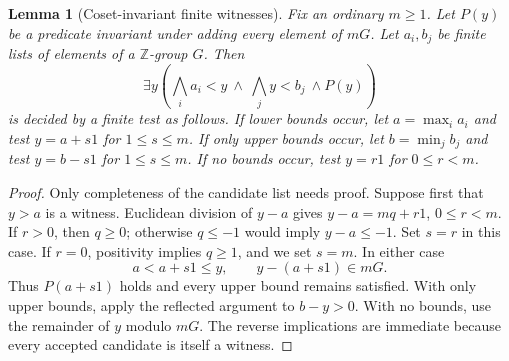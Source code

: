 \documentclass[11pt]{article}
\numberwithin{equation}{section}
\newtheorem{lemma}[lemma]{Lemma}
\theoremstyle{definition}
\theoremstyle{remark}
\newcommand{\Z}{\mathbb Z}
\begin{document}
\begin{lemma}[Coset-invariant finite witnesses]\label{pma:lc:lem:cooper}
Fix an ordinary $m\ge1$. Let $P(y)$ be a predicate invariant under adding
\emph{every element of $mG$}. Let $a_i,b_j$ be finite lists of elements
of a $\Z$-group $G$. Then
\[
 \exists y\left(\bigwedge_i a_i<y\ \wedge\ \bigwedge_j y<b_j\ \wedge P(y)\right)
\]
is decided by a finite test as follows. If lower bounds occur, let
$a=\max_i a_i$ and test $y=a+s1$ for $1\le s\le m$. If only upper
bounds occur, let $b=\min_jb_j$ and test $y=b-s1$ for $1\le s\le m$.
If no bounds occur, test $y=r1$ for $0\le r<m$.
\end{lemma}
\begin{proof}
Only completeness of the candidate list needs proof. Suppose first that
$y>a$ is a witness. Euclidean division of $y-a$ gives
$y-a=mq+r1$, $0\le r<m$. If $r>0$, then $q\ge0$; otherwise
$q\le-1$ would imply $y-a\le-1$. Set $s=r$ in this case.
If $r=0$, positivity implies $q\ge1$, and we set $s=m$.
In either case
\[
 a<a+s1\le y,\qquad y-(a+s1)\in mG.
\]
Thus $P(a+s1)$ holds and every upper bound remains satisfied. With only
upper bounds, apply the reflected argument to $b-y>0$. With no bounds,
use the remainder of $y$ modulo $mG$. The reverse implications are
immediate because every accepted candidate is itself a witness.
\end{proof}
\end{document}
